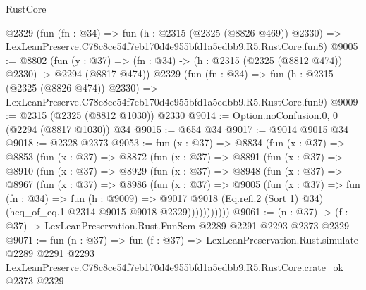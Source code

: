 \begin{lexlean}{RustCore}
\begin{coremodule}
    @2329
    (fun (fn : @34) =>
    fun (h : @2315 (@2325 (@8826 @469)) @2330) =>
    LexLeanPreserve.C78c8ce54f7eb170d4e955bfd1a5edbb9.R5.RustCore.fun8)
@9005 := @8802
    (fun (y : @37) => (fn : @34) -> (h : @2315 (@2325 (@8812 @474)) @2330) -> @2294 (@8817 @474))
    @2329
    (fun (fn : @34) =>
    fun (h : @2315 (@2325 (@8826 @474)) @2330) =>
    LexLeanPreserve.C78c8ce54f7eb170d4e955bfd1a5edbb9.R5.RustCore.fun9)
@9009 := @2315 (@2325 (@8812 @1030)) @2330
@9014 := Option.noConfusion.{0, 0} (@2294 (@8817 @1030)) @34
@9015 := @654 @34
@9017 := @9014 @9015 @34
@9018 := @2328 @2373
@9053 := fun (x : @37) =>
  @8834
    (fun (x : @37) =>
    @8853
      (fun (x : @37) =>
      @8872
        (fun (x : @37) =>
        @8891
          (fun (x : @37) =>
          @8910
            (fun (x : @37) =>
            @8929
              (fun (x : @37) =>
              @8948
                (fun (x : @37) =>
                @8967
                  (fun (x : @37) =>
                  @8986
                    (fun (x : @37) =>
                    @9005
                      (fun (x : @37) =>
                      fun (fn : @34) =>
                      fun (h : @9009) =>
                      @9017
                        @9018
                        (Eq.refl.{2} (Sort 1) @34)
                        (heq_of_eq.{1} @2314 @9015 @9018 @2329)))))))))))
@9061 := (n : @37) -> (f : @37) -> LexLeanPreservation.Rust.FunSem @2289 @2291 @2293 @2373 @2329
@9071 := fun (n : @37) =>
  fun (f : @37) =>
  LexLeanPreservation.Rust.simulate
    @2289
    @2291
    @2293
    LexLeanPreserve.C78c8ce54f7eb170d4e955bfd1a5edbb9.R5.RustCore.crate_ok
    @2373
    @2329
\end{coremodule}
\end{lexlean}
